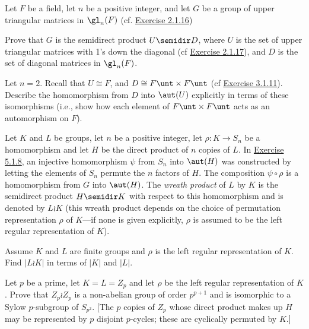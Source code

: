 \begin{sol}

\end{sol}

\begin{exercise}\label{ex5.5.22}
    Let $F$ be a field, let $n$ be a positive integer, and let $G$ be a group of upper triangular matrices in $\gl_n(F)$ (cf. \hyperref[ex2.1.16]{Exercise 2.1.16})
    \begin{subproblems}
        \item Prove that $G$ is the semidirect product $U \semidir D$, where $U$ is the set of upper triangular matrices with 1's down the diagonal (cf \hyperref[ex2.1.17]{Exercise 2.1.17}), and $D$ is the set of diagonal matrices in $\gl_n(F)$.
        \item Let $n = 2$. Recall that $U \cong F$, and $D \cong F\unt \times F\unt$ (cf \hyperref[ex3.1.11]{Exercise 3.1.11}). Describe the homomorphism from $D$ into $\aut(U)$ explicitly in terms of these isomorphisms (i.e., show how each element of $F\unt \times F\unt$ acts as an automorphism on $F$).
    \end{subproblems}
\end{exercise}

\begin{exercise}\label{ex5.5.23}
    Let $K$ and $L$ be groups, let $n$ be a positive integer, let $\rho : K \to S_n$ be a homomorphism and let $H$ be the direct product of $n$ copies of $L$. In \hyperref[ex5.1.8]{Exercise 5.1.8}, an injective homomorphism $\psi$ from $S_n$ into $\aut(H)$ was constructed by letting the elements of $S_n$ permute the $n$ factors of $H$. The composition $\psi \circ \rho$ is a homomorphism from $G$ into $\aut(H)$. The \emph{wreath product} of $L$ by $K$ is the semidirect product $H \semidir K$ with respect to this homomorphism and is denoted by $L \wr K$ (this wreath product depends on the choice of permutation representation $\rho$ of $K$---if none is given explicitly, $\rho$ is assumed to be the left regular representation of $K$).
    \begin{subproblems}
        \item Assume $K$ and $L$ are finite groups and $\rho$ is the left regular representation of $K$. Find $|L \wr K|$ in terms of $|K|$ and $|L|$.
        \item Let $p$ be a prime, let $K = L = Z_p$ and let $\rho$ be the left regular representation of $K$. Prove that $Z_p \wr Z_p$ is a non-abelian group of order $p^{p+1}$ and is isomorphic to a Sylow $p$-subgroup of $S_{p^2}$. [The $p$ copies of $Z_p$ whose direct product makes up $H$ may be represented by $p$ disjoint $p$-cycles; these are cyclically permuted by $K$.]
    \end{subproblems}
\end{exercise}

